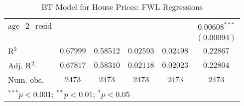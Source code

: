 \begin{table}
\begin{center}
\begin{footnotesize}
\begin{tabular}{l c c c c c}
age\_2\_resid     &                  &                  &                  &                  & $0.00608^{***}$  \\
                  &                  &                  &                  &                  & $(0.00094)$      \\
\hline
R$^2$             & $0.67999$        & $0.58512$        & $0.02593$        & $0.02498$        & $0.22867$        \\
Adj. R$^2$        & $0.67817$        & $0.58310$        & $0.02118$        & $0.02023$        & $0.22804$        \\
Num. obs.         & $2473$           & $2473$           & $2473$           & $2473$           & $2473$           \\
\hline
\multicolumn{6}{l}{\tiny{$^{***}p<0.001$; $^{**}p<0.01$; $^{*}p<0.05$}}
\end{tabular}
\end{footnotesize}
\caption{BT Model for House Prices: FWL Regressions}
\label{tab:reg_bt_age_fwl}
\end{center}
\end{table}

